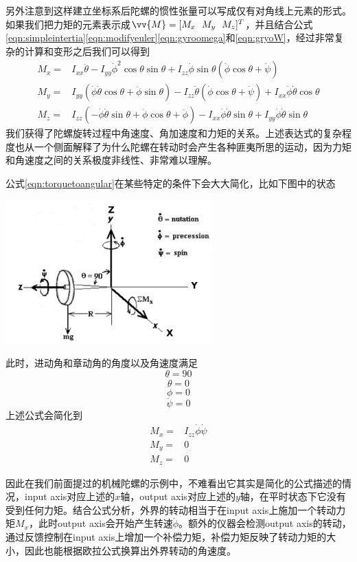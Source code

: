 \documentclass[11pt]{article}
\begin{document}
另外注意到这样建立坐标系后陀螺的惯性张量可以写成仅有对角线上元素的形式。如果我们把力矩的元素表示成$\vv{M} = [M_x \ \ M_y \ \ M_z]^T$，并且结合公式\ref{eqn:simpleintertia}\ref{eqn:modifyeuler}\ref{eqn:gyroomega}和\ref{eqn:gryoW}，经过非常复杂的计算和变形之后我们可以得到
\begin{align}\label{eqn:torquetoangular}
M_x = &	I_{xx}\ddot{\theta} - I_{yy}\dot{\phi}^2\cos\theta\sin\theta + I_{zz}\dot{\phi}\sin\theta(\dot{\phi}\cos\theta + \dot{\psi}) \\ 
M_y = & I_{yy}(\dot{\phi}\dot{\theta}\cos\theta + \ddot{\phi}\sin\theta) - I_{zz}\dot{\theta}(\dot{\phi}\cos\theta + \dot{\psi}) + I_{xx}\dot{\phi}\dot{\theta}\cos\theta	\\
M_z = & I_{zz}(-\dot{\phi}\dot{\theta}\sin\theta + \ddot{\phi}\cos\theta + \ddot{\phi}) - I_{xx}\dot{\phi}\dot{\theta}\sin\theta + I_{yy}\dot{\phi}\dot{\theta}\sin\theta 
\end{align}
我们获得了陀螺旋转过程中角速度、角加速度和力矩的关系。上述表达式的复杂程度也从一个侧面解释了为什么陀螺在转动时会产生各种匪夷所思的运动，因为力矩和角速度之间的关系极度非线性、非常难以理解。

公式\ref{eqn:torquetoangular}在某些特定的条件下会大大简化，比如下图中的状态

\begin{center}
\includegraphics[width=0.6\textwidth]{images/gyroframe2.png}
\end{center}

此时，进动角和章动角的角度以及角速度满足
$$
\theta = 90
$$
$$
\dot{\theta} = 0
$$
$$
\ddot{\phi} = 0
$$
$$
\ddot{\psi} = 0
$$
上述公式会简化到
\begin{align}\label{eqn:torquetoangularsimple}
M_x = &	I_{zz}\dot{\phi}\dot{\psi} \\ 
M_y = & 0	\\
M_z = & 0
\end{align}

因此在我们前面提过的机械陀螺的示例中，不难看出它其实是简化的公式描述的情况，input axis对应上述的$x$轴，output axis对应上述的$y$轴，在平时状态下它没有受到任何力矩。结合公式分析，外界的转动相当于在input axis上施加一个转动力矩$M_x$，此时output axis会开始产生转速$\dot{\phi}$。额外的仪器会检测output axis的转动，通过反馈控制在input axis上增加一个补偿力矩，补偿力矩反映了转动力矩的大小，因此也能根据欧拉公式换算出外界转动的角速度。
\end{document}
